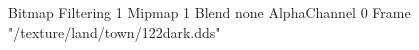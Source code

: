 {Bitmap
	{Filtering 1}
	{Mipmap 1}
	{Blend none}
	{AlphaChannel 0}
	{Frame "/texture/land/town/122dark.dds"}
}
